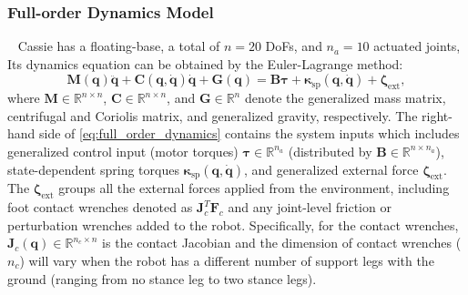 \subsubsection{Full-order Dynamics Model}~\label{subsec:full_order_dynamics}
Cassie has a floating-base, a total of $n=20$ DoFs, and $n_a=10$ actuated joints, Its dynamics equation can be obtained by the Euler-Lagrange method:
\begin{equation}\label{eq:full_order_dynamics}
    \mathbf{M}(\mathbf{q})\ddot{\mathbf{q}} + \mathbf{C}(\mathbf{q}, \dot{\mathbf{q}})\dot{\mathbf{q}} + \mathbf{G}(\mathbf{q}) = \mathbf{B}\bm{\tau} + \bm{\kappa}_{\text{sp}}(\mathbf{q},\dot{\mathbf{q}}) + \bm{\zeta}_{\text{ext}},
\end{equation}\noindent 
where $\mathbf{M} \in \mathbb{R}^{n\times n}$, $\mathbf{C} \in \mathbb{R}^{n\times n}$, and $\mathbf{G}\in \mathbb{R}^{n}$ denote the generalized mass matrix, centrifugal and Coriolis matrix, and generalized gravity, respectively.  
The right-hand side of \eqref{eq:full_order_dynamics} contains the system inputs which includes generalized control input (motor torques) $\bm{\tau}\in\mathbb{R}^{n_a}$ (distributed by $\mathbf{B}\in \mathbb{R}^{n\times n_a}$), state-dependent spring torques $\bm{\kappa}_{\text{sp}}(\mathbf{q},\dot{\mathbf{q}})$, and generalized external force $\bm{\zeta}_{\text{ext}}$.
The $\bm{\zeta}_{\text{ext}}$ groups all the external forces applied from the environment, including foot contact wrenches denoted as $\mathbf{J}^T_{c} \mathbf{F}_c$ and any joint-level friction or perturbation wrenches added to the robot. 
Specifically, for the contact wrenches, $\mathbf{J}_c(\mathbf{q}) \in \mathbb{R}^{n_c\times n}$ is the contact Jacobian and the dimension of contact wrenches ($n_c$) will vary when the robot has a different number of support legs with the ground (ranging from no stance leg to two stance legs). 


